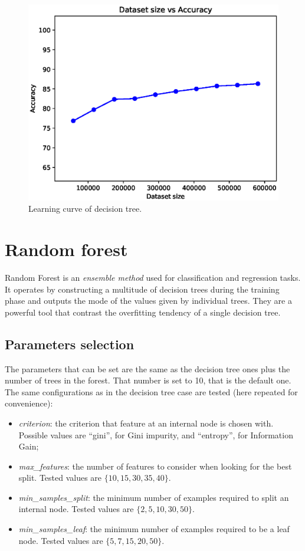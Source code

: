 \documentclass[a4paper, 10pt]{article}
\begin{document}
\begin{figure}[H]
 \centering
 \includegraphics[width=0.8\linewidth]{pictures/decision_tree_size_vs_accuracy.eps}
 \caption{Learning curve of decision tree.}
 \label{fig:dt_learning}
\end{figure}

\section{Random forest}
Random Forest is an \emph{ensemble method} used for classification and regression tasks. It operates by constructing a multitude of decision trees during the training phase and outputs the mode of the values given by individual trees. They are a powerful tool that contrast the overfitting tendency of a single decision tree.

\subsection{Parameters selection}

The parameters that can be set are the same as the decision tree ones plus the number of trees in the forest. That number is set to 10, that is the default one. The same configurations as in the decision tree case are tested (here repeated for convenience):

\begin{itemize}
 \item \emph{criterion}: the criterion that feature at an internal node is chosen with. Possible values are ``gini'', for Gini impurity, and ``entropy'', for Information Gain;
 \item \emph{max\_features}: the number of features to consider when looking for the best split. Tested values are $\{10, 15, 30, 35, 40\}$.
 \item \emph{min\_samples\_split}: the minimum number of examples required to split an internal node. Tested values are $\{2, 5, 10, 30, 50\}$.
 \item \emph{min\_samples\_leaf}: the minimum number of examples required to be a leaf node. Tested values are $\{5, 7, 15, 20, 50\}$.
\end{itemize}
\end{document}
